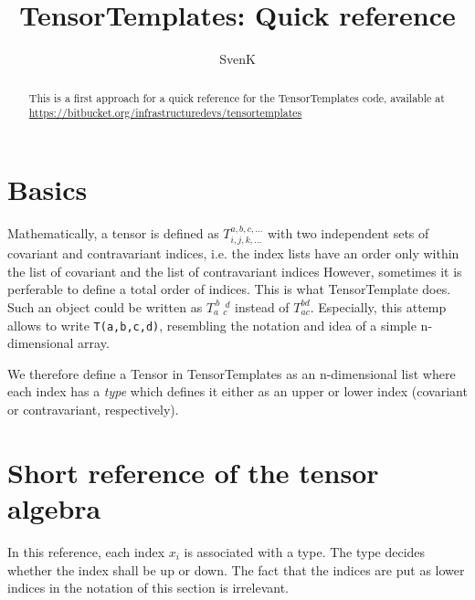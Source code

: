 \documentclass[a4paper]{article}
\begin{document}
\title{TensorTemplates: Quick reference} 
\author{SvenK}

\maketitle

\begin{abstract}
This is a first approach for a quick
reference for the TensorTemplates code,
available at
\url{https://bitbucket.org/infrastructuredevs/tensortemplates}
\end{abstract}

\section{Basics}

Mathematically, a tensor is defined as $T^{a,b,c,\dots}_{i,j,k,\dots}$ with two independent sets of covariant and contravariant indices, i.e. the index lists have an order only within the list of covariant and the list of contravariant indices However, sometimes it is perferable to define a total order of indices. This is what TensorTemplate does. Such an object could be written as $T_a^{~b} {~}_c^{~d}$ instead of $T_{ac}^{bd}$. Especially, this attemp allows to write \texttt{T(a,b,c,d)}, resembling the notation and idea of a simple n-dimensional array.

We therefore define a Tensor in TensorTemplates as an n-dimensional list where each index has a \emph{type} which defines it either as an upper or lower index (covariant or contravariant, respectively).

\section{Short reference of the tensor algebra}
In this reference, each index $x_i$ is
associated with a type. The type decides whether
the index shall be up or down. The fact that
the indices are put as lower indices in the
notation of this section is irrelevant.
\end{document}
